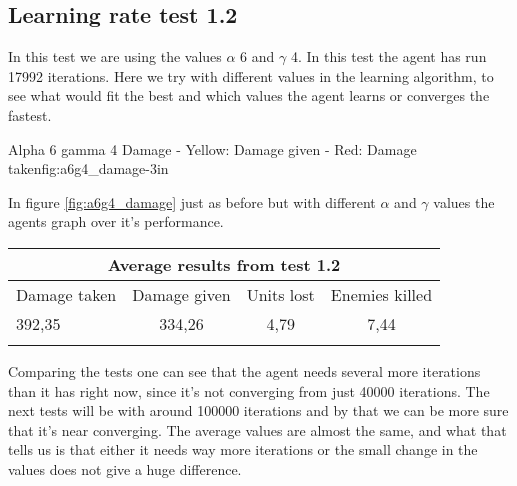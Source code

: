 \subsection*{Learning rate test 1.2}
In this test we are using the values $\alpha$ 6 and $\gamma$ 4. In this test the agent has run 17992 iterations. Here we try with different values in the learning algorithm, to see what would fit the best and which values the agent learns or converges the fastest.


			{Alpha 6 gamma 4 Damage - Yellow: Damage given - Red: Damage taken}{fig:a6g4_damage}{-3in}

In figure \ref{fig:a6g4_damage} just as before but with different $\alpha$ and $\gamma$ values the agents graph over it's performance.






\begin{centering}
 \begin{tabular}{|l||c|c|c|}
	\multicolumn{4}{c}{Average results from test 1.2} \\
	\hline
		Damage taken & Damage given & Units lost & Enemies killed\\
	\hline
		392,35 & 334,26 & 4,79 & 7,44 \\
	\hline
\label{test1.2}
\end{tabular}
\end{centering}





Comparing the tests one can see that the agent needs several more iterations than it has right now, since it's not converging from just 40000 iterations. The next tests will be with around 100000 iterations and by that we can be more sure that it's near converging. The average values are almost the same, and what that tells us is that either it needs way more iterations or the small change in the values does not give a huge difference.

